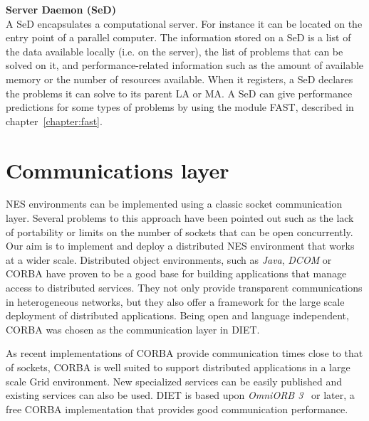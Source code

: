 \begin{description}
\item \textbf{Server Daemon (SeD)}\\
  A SeD encapsulates a computational server. For instance it can be
  located on the entry point of a parallel computer. The information
  stored on a SeD is a list of the data available locally (i.e. on
  the server), the list of problems
  that can be solved on it, and performance-related information such
  as the amount of available memory or the number of resources
  available. When it registers, a SeD declares the problems it can
  solve to its parent LA or MA.  A SeD can give performance
  predictions for some types of problems by using the module FAST,
  described in chapter~\ref{chapter:fast}.

\end{description}


\section{Communications layer}
\label{sec:CORBA}

NES environments can be implemented using a classic socket
communication layer.  Several problems to this approach have been
pointed out such as the lack of portability or limits on the
number of sockets that can be open concurrently.
Our aim is to implement and deploy a distributed NES
environment that works at a wider scale. Distributed object
environments, such as \emph{Java}, \emph{DCOM} or CORBA have proven to
be a good base for building applications that manage access to
distributed services. They not only provide transparent communications
in heterogeneous networks, but they also offer a framework for the
large scale deployment of distributed applications. Being open and
language independent, CORBA was chosen as the communication layer in
DIET.

As recent implementations of CORBA provide communication times close to
that of sockets, CORBA is well suited to support distributed 
applications in a large scale Grid environment. New specialized
services can be easily published and existing services can also be
used.  DIET is based upon \emph{OmniORB 3}~\cite{OMNIORB} or later,
a free CORBA implementation that provides good communication
performance.



